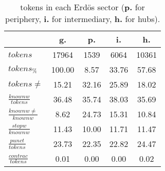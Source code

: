 \begin{table}[h!]
\begin{center}
\begin{tabular}{| l || c | c | c | c |}\hline
 & {\bf g.} & {\bf p.} & {\bf i.} & {\bf h.} \\\hline\hline
$tokens$ & 17964  & 1539  & 6064  & 10361 \\
$tokens_{\%}$ & 100.00  & 8.57  & 33.76  & 57.68 \\
$tokens \neq$ & 15.21  & 32.16  & 25.89  & 18.02 \\\hline
$\frac{knownw}{tokens}$ & 36.48  & 35.74  & 38.03  & 35.69 \\
$\frac{knownw \neq}{knownw}$ & 8.62  & 24.73  & 15.31  & 10.84 \\\hline
$\frac{stopw}{knownw}$ & 11.43  & 10.00  & 11.71  & 11.47 \\
$\frac{punct}{tokens}$ & 23.73  & 22.35  & 22.82  & 24.47 \\
$\frac{contrac}{tokens}$ & 0.01  & 0.00  & 0.00  & 0.02 \\\hline
\end{tabular}
\caption{tokens in each Erd\"os sector ({{\bf p.}} for periphery, {{\bf i.}} for intermediary, 
    {{\bf h.}} for hubs).}
\end{center}
\end{table}